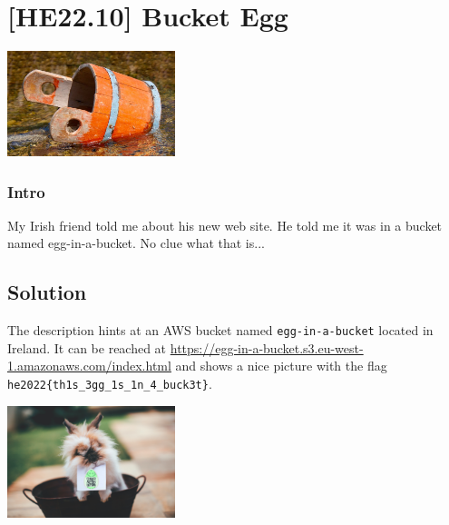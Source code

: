 
\hypertarget{he22.10}{%
\chapter{[HE22.10] Bucket Egg}\label{he22.10}}

\begin{marginfigure}
	\includegraphics[width=49mm]{level4/challenge10.jpg}
\end{marginfigure}
\subsection{Intro}
My Irish friend told me about his new web site. He told me it was in a bucket
named egg-in-a-bucket. No clue what that is...

\section{Solution}\label{hv21.10-solution}

The description hints at an AWS bucket named \verb+egg-in-a-bucket+ located in
Ireland.  It can be reached at
\url{https://egg-in-a-bucket.s3.eu-west-1.amazonaws.com/index.html} and shows a
nice picture with the flag \verb+he2022{th1s_3gg_1s_1n_4_buck3t}+.

\begin{marginfigure}
	\includegraphics[width=49mm]{level4/bucketbg.jpg}
\end{marginfigure}



